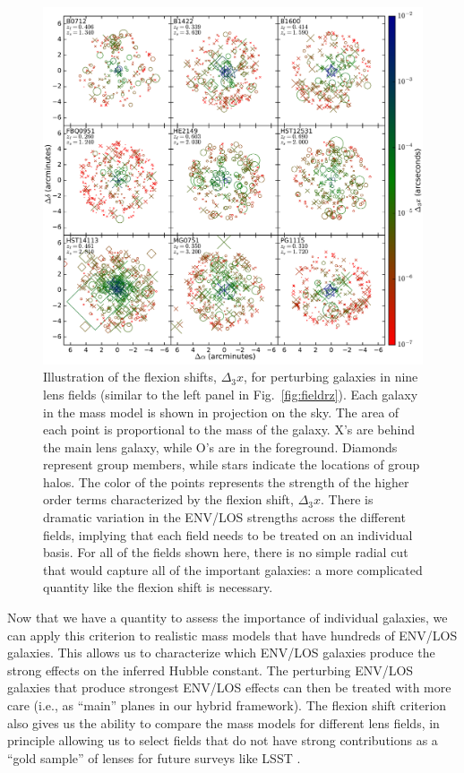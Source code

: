\documentclass{emulateapj}
\providecommand{\DIFaddtex}[1]{{\protect\color{blue}\uwave{#1}}} %
\providecommand{\DIFaddbegin}{} %
\providecommand{\DIFaddend}{} %
\providecommand{\DIFadd}[1]{\texorpdfstring{\DIFaddtex{#1}}{#1}} %
\begin{document}
\begin{figure}
\begin{center}
\includegraphics[width=1\textwidth]{allfields.pdf}
\caption{\label{fig:allfields} Illustration of the flexion shifts, $\Delta_3 x$, for perturbing galaxies in nine lens fields (similar to the left panel in Fig.\ \ref{fig:fieldrz}). Each galaxy in the mass model is shown in projection on the sky. The area of each point is proportional to the mass of the galaxy. X's are behind the main lens galaxy, while O's are in the foreground. Diamonds represent group members, while stars indicate the locations of group halos. The color of the points represents the strength of the higher order terms characterized by the flexion shift, $\Delta_3 x$. There is dramatic variation in the ENV/LOS strengths across the different fields, implying that each field needs to be treated on an individual basis. For all of the fields shown here, there is no simple radial cut that would capture all of the important galaxies: a more complicated quantity like the flexion shift is necessary. 
}
\end{center}
\end{figure}

Now that we have a quantity to assess the importance of individual galaxies, we can apply this criterion to realistic mass models that have hundreds of ENV/LOS galaxies. This allows us to characterize which ENV/LOS galaxies produce the strong effects on the inferred Hubble constant. The perturbing ENV/LOS galaxies that produce strongest ENV/LOS effects can then be treated with more care (i.e., as ``main'' planes in our hybrid framework). The flexion shift criterion also gives us the ability to compare the mass models for different lens fields, in principle allowing us to select fields that do not have strong contributions as a ``gold sample'' of lenses for future surveys like LSST \DIFaddbegin \DIFadd{and Euclid}\DIFaddend . 
\end{document}
